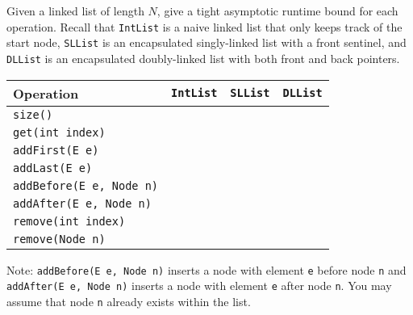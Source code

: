 \question

Given a linked list of length $N$, give a tight asymptotic runtime
bound for each operation. Recall that \lstinline$IntList$ is a naive linked
list that only keeps track of the start node, \lstinline$SLList$ is an 
encapsulated singly-linked list with a front sentinel, and \lstinline$DLList$ 
is an encapsulated doubly-linked list with both front and back pointers.


\ifprintanswers\else
\renewcommand{\arraystretch}{2}
\setlength{\tabcolsep}{16pt}
\begin{tabularx}{\textwidth}{Xccc}
Operation                          & \lstinline$IntList$ & \lstinline$SLList$ & \lstinline$DLList$ \\ \hline
\lstinline$size()$                 &                     &                    &                    \\
\lstinline$get(int index)$         &                     &                    &                    \\
\lstinline$addFirst(E e)$          &                     &                    &                    \\
\lstinline$addLast(E e)$           &                     &                    &                    \\
\lstinline$addBefore(E e, Node n)$ &                     &                    &                    \\
\lstinline$addAfter(E e, Node n)$  &                     &                    &                    \\
\lstinline$remove(int index)$      &                     &                    &                    \\
\lstinline$remove(Node n)$         &                     &                    &                    \\
\end{tabularx}

Note: \lstinline{addBefore(E e, Node n)} inserts a node with element \lstinline{e} 
before node \lstinline{n} and \lstinline{addAfter(E e, Node n)} inserts a node with 
element \lstinline{e} after node \lstinline{n}.
You may assume that node \lstinline{n} already exists within the list.
\fi

